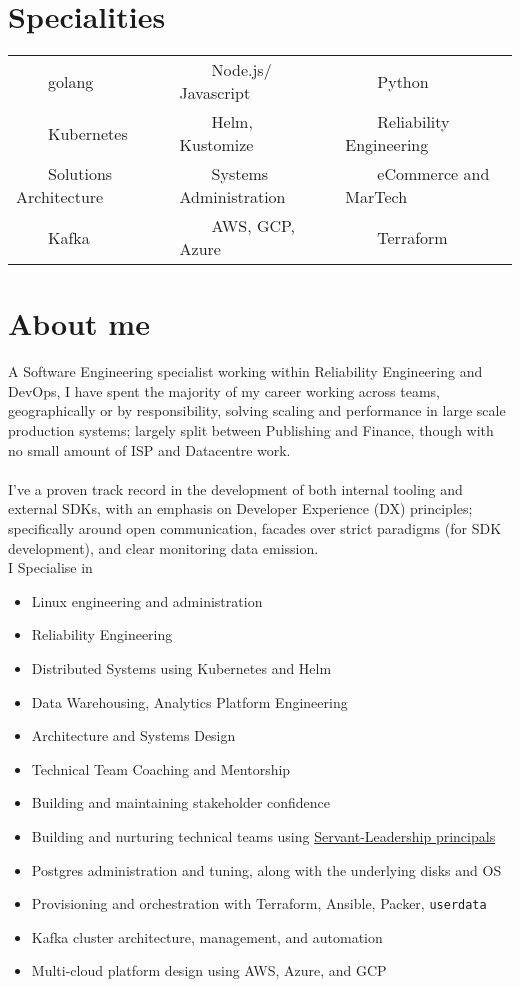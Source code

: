 \documentclass[11pt,a4paper,sans]{article}
\newcommand{\tabitem}{~~\llap{\textbullet}~~}
\begin{document}
\newcommand{\job}{Engineering Lead/ Principal Engineer}


\section{Specialities}
\begin{tabular}{lll}
  \tabitem golang & \tabitem Node.js/ Javascript & \tabitem Python \\
  \tabitem Kubernetes & \tabitem Helm, Kustomize & \tabitem Reliability Engineering \\
  \tabitem Solutions Architecture & \tabitem Systems Administration & \tabitem eCommerce and MarTech \\
  \tabitem Kafka & \tabitem AWS, GCP, Azure & \tabitem Terraform  \\
\end{tabular}

\section{About me}
A Software Engineering specialist working within Reliability Engineering and DevOps, I have spent the majority of my career working across teams, geographically or by responsibility, solving scaling and performance in large scale production systems; largely split between Publishing and Finance, though with no small amount of ISP and Datacentre work. \\
\\
I've a proven track record in the development of both internal tooling and external SDKs, with an emphasis on Developer Experience (DX) principles; specifically around open communication, facades over strict paradigms (for SDK development), and clear monitoring data emission.
\\
I Specialise in

\begin{itemize}
\item Linux engineering and administration
\item Reliability Engineering
\item Distributed Systems using Kubernetes and Helm
\item Data Warehousing, Analytics Platform Engineering
\item Architecture and Systems Design
\item Technical Team Coaching and Mentorship
\item Building and maintaining stakeholder confidence
\item Building and nurturing technical teams using \href{https://www.mindtools.com/pages/article/servant-leadership.htm}{Servant-Leadership principals}
\item Postgres administration and tuning, along with the underlying disks and OS
\item Provisioning and orchestration with Terraform, Ansible, Packer, \texttt{userdata}
\item Kafka cluster architecture, management, and automation
\item Multi-cloud platform design using AWS, Azure, and GCP
\end{itemize}






\end{document}
